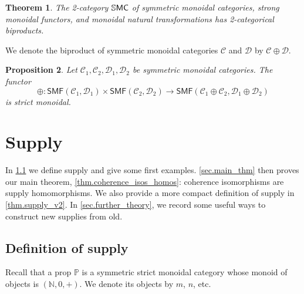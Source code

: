 \documentclass[11pt, oneside, article]{memoir}
\theoremstyle{plain}
\newtheorem{theorem}{Theorem}[chapter]
\newtheorem{proposition}[theorem]{Proposition}
\theoremstyle{definition}
\theoremstyle{remark}
\newcommand{\cat}[1]{\mathcal{#1}}%
\newcommand{\Cat}[1]{{\mathsf{#1}}}%
\newcommand{\CCat}[1]{\mathbb{\StrLeft{#1}{1}}\Cat{\StrGobbleLeft{#1}{1}}}%
\newcommand{\smf}{\Cat{SMF}}
\newcommand{\ssmc}{\CCat{SMC}}
\newcommand{\nn}{\mathbb{N}}
\newcommand{\pp}{\mathbb{P}}
\begin{document}
\begin{theorem}\label{thm.smc_biprod}
The 2-category $\ssmc$ of symmetric monoidal categories, strong monoidal functors, and monoidal natural transformations has 2-categorical biproducts.
\end{theorem}

We denote the biproduct of symmetric monoidal categories $\cat{C}$ and $\cat{D}$ by $\cat{C}\oplus\cat{D}$.

\begin{proposition}\label{prop.biprod_smf_strict}
Let $\cat{C}_1,\cat{C}_2,\cat{D}_1,\cat{D}_2$ be symmetric monoidal categories. The functor
\[
  \oplus\colon
  \smf(\cat{C}_1,\cat{D}_1)\times\smf(\cat{C}_2,\cat{D}_2)
  \to
  \smf(\cat{C}_1\oplus\cat{C}_2,\cat{D}_1\oplus\cat{D}_2)
\]
is strict monoidal.
\end{proposition}

\chapter{Supply}

In \cref{sec.supply} we define supply and give some first examples. \cref{sec.main_thm} then proves our main theorem, \cref{thm.coherence_isos_homos}: coherence isomorphisms are supply homomorphisms. We also provide a more compact definition of supply in \cref{thm.supply_v2}. In \cref{sec.further_theory}, we record some useful ways to construct new supplies from old. 

\section{Definition of supply}\label{sec.supply}

Recall that a prop $\pp$ is a symmetric strict monoidal category whose monoid of objects is $(\nn,0,+)$. We denote its objects by $m$, $n$, etc.
\end{document}
